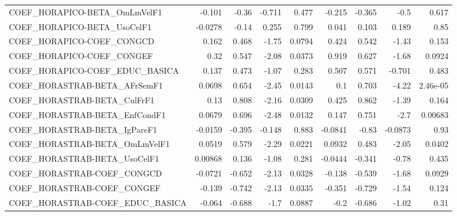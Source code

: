 \begin{tabular}{lrrrrrrrr}
COEF\_HORAPICO-BETA\_OmLmVelF1          &      -0.101 &        -0.36 &  -0.711 &    0.477 &     -0.215 &      -0.365 &         -0.5 &         0.617 \\
COEF\_HORAPICO-BETA\_UsoCelF1           &     -0.0278 &        -0.14 &   0.255 &    0.799 &      0.041 &       0.103 &        0.189 &          0.85 \\
COEF\_HORAPICO-COEF\_CONGCD             &       0.162 &        0.468 &   -1.75 &   0.0794 &      0.424 &       0.542 &        -1.43 &         0.153 \\
COEF\_HORAPICO-COEF\_CONGEF             &        0.32 &        0.547 &   -2.08 &   0.0373 &      0.919 &       0.627 &        -1.68 &        0.0924 \\
COEF\_HORAPICO-COEF\_EDUC\_BASICA        &       0.137 &        0.473 &   -1.07 &    0.283 &      0.507 &       0.571 &       -0.701 &         0.483 \\
COEF\_HORASTRAB-BETA\_AFrSemF1          &      0.0698 &        0.654 &   -2.45 &   0.0143 &        0.1 &       0.703 &        -4.22 &      2.46e-05 \\
COEF\_HORASTRAB-BETA\_CulFrF1           &        0.13 &        0.808 &   -2.16 &   0.0309 &      0.425 &       0.862 &        -1.39 &         0.164 \\
COEF\_HORASTRAB-BETA\_EnfCondF1         &      0.0679 &        0.696 &   -2.48 &   0.0132 &      0.147 &       0.751 &         -2.7 &       0.00683 \\
COEF\_HORASTRAB-BETA\_IgPareF1          &     -0.0159 &       -0.395 &  -0.148 &    0.883 &    -0.0841 &       -0.83 &      -0.0873 &          0.93 \\
COEF\_HORASTRAB-BETA\_OmLmVelF1         &      0.0519 &        0.579 &   -2.29 &   0.0221 &     0.0932 &       0.483 &        -2.05 &        0.0402 \\
COEF\_HORASTRAB-BETA\_UsoCelF1          &     0.00868 &        0.136 &   -1.08 &    0.281 &    -0.0444 &      -0.341 &        -0.78 &         0.435 \\
COEF\_HORASTRAB-COEF\_CONGCD            &     -0.0721 &       -0.652 &   -2.13 &   0.0328 &     -0.138 &      -0.539 &        -1.68 &        0.0929 \\
COEF\_HORASTRAB-COEF\_CONGEF            &      -0.139 &       -0.742 &   -2.13 &   0.0335 &     -0.351 &      -0.729 &        -1.54 &         0.124 \\
COEF\_HORASTRAB-COEF\_EDUC\_BASICA       &      -0.064 &       -0.688 &    -1.7 &   0.0887 &       -0.2 &      -0.686 &        -1.02 &          0.31 \\

\end{tabular}
